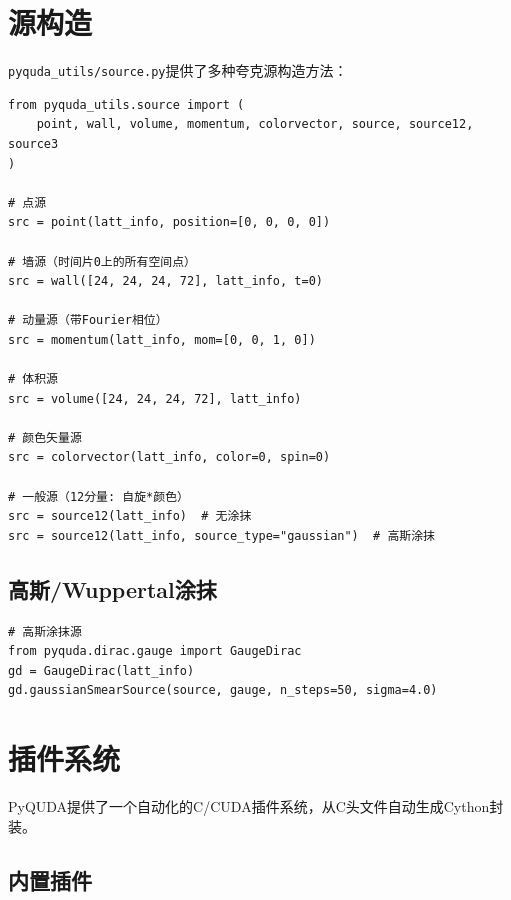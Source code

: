 \documentclass[12pt,a4paper]{ctexart}
\begin{document}
\section{源构造}

\texttt{pyquda\_utils/source.py}提供了多种夸克源构造方法：

\begin{lstlisting}[caption={源构造方法}]
from pyquda_utils.source import (
    point, wall, volume, momentum, colorvector, source, source12, source3
)

# 点源
src = point(latt_info, position=[0, 0, 0, 0])

# 墙源（时间片0上的所有空间点）
src = wall([24, 24, 24, 72], latt_info, t=0)

# 动量源（带Fourier相位）
src = momentum(latt_info, mom=[0, 0, 1, 0])

# 体积源
src = volume([24, 24, 24, 72], latt_info)

# 颜色矢量源
src = colorvector(latt_info, color=0, spin=0)

# 一般源（12分量: 自旋*颜色）
src = source12(latt_info)  # 无涂抹
src = source12(latt_info, source_type="gaussian")  # 高斯涂抹
\end{lstlisting}

\subsection{高斯/Wuppertal涂抹}

\begin{lstlisting}[caption={高斯涂抹}]
# 高斯涂抹源
from pyquda.dirac.gauge import GaugeDirac
gd = GaugeDirac(latt_info)
gd.gaussianSmearSource(source, gauge, n_steps=50, sigma=4.0)
\end{lstlisting}

\section{插件系统}

PyQUDA提供了一个自动化的C/CUDA插件系统，从C头文件自动生成Cython封装。

\subsection{内置插件}
\end{document}
